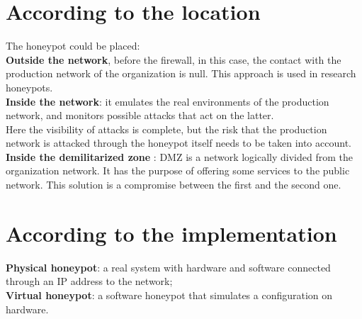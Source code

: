 \section{According to the location}
The honeypot could be placed: \\
\textbf{Outside the network}, before the firewall, in this case, the contact with the production network of the organization is null. This approach is used in research honeypots. \\
\textbf{Inside the network}: it emulates the real environments of the production network, and monitors possible attacks that act on the latter. \\
Here the visibility of attacks is complete, but the risk that the production network is attacked through the honeypot itself needs to be taken into account. \\
\textbf{Inside the demilitarized zone} : DMZ is a network logically divided from the organization network. It has the purpose of offering some services to the public network. This solution is a compromise between the first and the second one.

\section{According to the implementation}
\textbf{Physical honeypot}: a real system with hardware and software connected through an IP address to the network;\\
\textbf{Virtual honeypot}: a software honeypot that simulates a configuration on hardware.\\\\